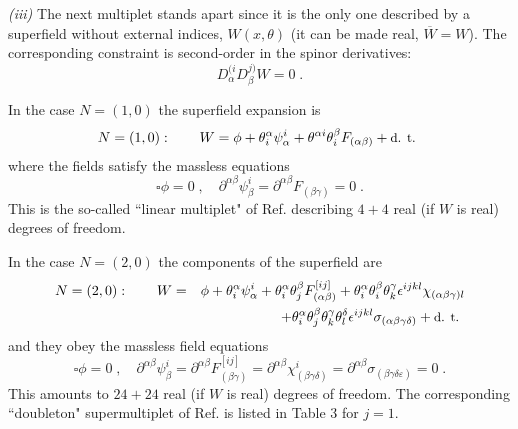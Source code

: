 \documentclass[a4paper,12pt]{article}
\begin{document}
{\sl (iii)} The next multiplet stands apart since it is the only 
one described by a superfield without external indices, 
$W(x,\theta)$ (it can be made real, $\overline W = W$). The 
corresponding constraint is second-order in the spinor 
derivatives: 
\begin{equation}\label{17}
 D^{(i}_\alpha D^{j)}_\beta W = 0\;.
\end{equation}

In the case $N=(1,0)$ the superfield expansion is 
\begin{equation}\label{18}
N=(1,0):\qquad    W = \phi + \theta^\alpha_i \psi^i_\alpha + 
\theta^{\alpha i}\theta^\beta_i F_{(\alpha\beta)} + \mbox{\small 
d. t. } 
\end{equation}
where the fields satisfy the massless equations
\begin{equation}\label{20'}
 \square\phi = 0\;, \quad 
\partial^{\alpha\beta}\psi^{i}_\beta = 
\partial^{\alpha\beta}F_{(\beta\gamma)} = 0\;. 
\end{equation}
This is the so-called ``linear multiplet" of Ref. \cite{bsvp} 
describing $4+4$ real (if $W$ is real) degrees of freedom. 


In the case $N=(2,0)$ the components of the superfield are
\begin{eqnarray}
  N=(2,0): \qquad W &=&   \phi + \theta^\alpha_i \psi^i_\alpha + \theta^{\alpha 
}_{i}\theta^\beta_j F^{[ij]}_{(\alpha\beta)} + \theta^\alpha_i 
\theta^\beta_i \theta^\gamma_k 
\epsilon^{ijkl}\chi_{(\alpha\beta\gamma)l} \nonumber\\ 
  && + \theta^\alpha_i 
\theta^\beta_j \theta^\gamma_k 
\theta^\delta_l\epsilon^{ijkl}\sigma_{(\alpha\beta\gamma\delta)} + 
\mbox{\small d. t. }  \label{19} 
\end{eqnarray}
and they obey the massless field equations
\begin{equation}\label{20}
 \square\phi = 0\;, \quad 
\partial^{\alpha\beta}\psi^{i}_\beta = 
\partial^{\alpha\beta}F^{[ij]}_{(\beta\gamma)} =
\partial^{\alpha\beta}\chi^i_{(\beta\gamma\delta)} = 
\partial^{\alpha\beta}\sigma_{(\beta\gamma\delta\varepsilon)} =
0\;.
\end{equation}
This amounts to $24+24$ real (if $W$ is real) degrees of freedom. 
The corresponding ``doubleton" supermultiplet of Ref. \cite{GT} is 
listed in Table 3 for $j=1$. 
\end{document}
